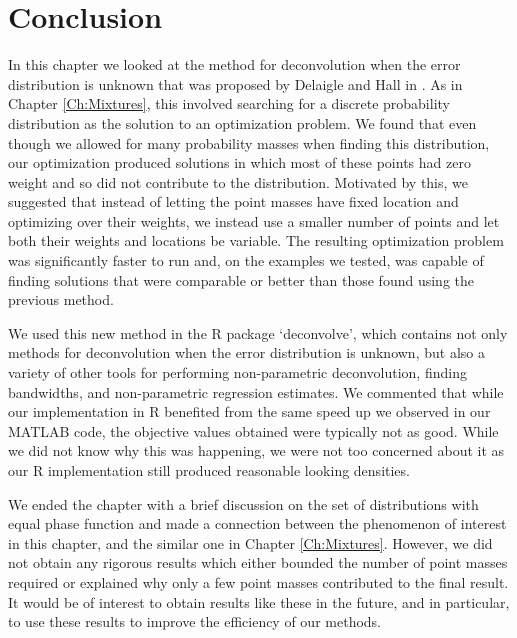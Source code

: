 	


\section{Conclusion}

In this chapter we looked at the method for deconvolution when the error distribution is unknown that was proposed by Delaigle and Hall in \cite{Delaigle2016-la}. As in Chapter \ref{Ch:Mixtures}, this involved searching for a discrete probability distribution as the solution to an optimization problem. We found that even though we allowed for many probability masses when finding this distribution, our optimization produced solutions in which most of these points had zero weight and so did not contribute to the distribution. Motivated by this, we suggested that instead of letting the point masses have fixed location and optimizing over their weights, we instead use a smaller number of points and let both their weights and locations be variable. The resulting optimization problem was significantly faster to run and, on the examples we tested, was capable of finding solutions that were comparable or better than those found using the previous method.

We used this new method in the R package `deconvolve', which contains not only methods for deconvolution when the error distribution is unknown, but also a variety of other tools for performing non-parametric deconvolution, finding bandwidths, and non-parametric regression estimates. We commented that while our implementation in R benefited from the same speed up we observed in our MATLAB code, the objective values obtained were typically not as good. While we did not know why this was happening, we were not too concerned about it as our R implementation still produced reasonable looking densities.

We ended the chapter with a brief discussion on the set of distributions with equal phase function and made a connection between the phenomenon of interest in this chapter, and the similar one in Chapter \ref{Ch:Mixtures}. However, we did not obtain any rigorous results which either bounded the number of point masses required or explained why only a few point masses contributed to the final result. It would be of interest to obtain results like these in the future, and in particular, to use these results to improve the efficiency of our methods.